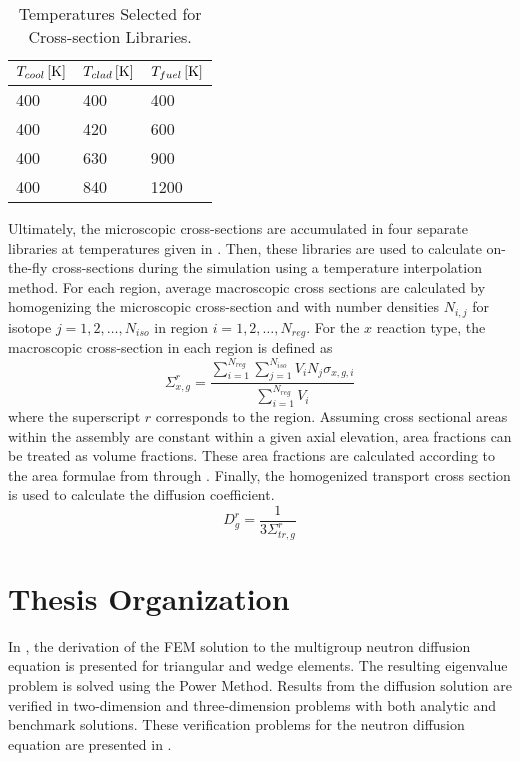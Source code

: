   \begin{table}
    \caption{Temperatures Selected for Cross-section Libraries.}
    \label{tab:xstemps}
    \begin{center}
      \begin{tabular}{lll}
        \toprule
        $T_{cool} \left[\text{{K}}\right]$ & $T_{clad} \left[\text{{K}}\right]$ & $T_{fuel} \left[\text{{K}}\right]$ \\
        \midrule
        400 & 400 & 400  \\
        400 & 420 & 600  \\
        400 & 630 & 900  \\
        400 & 840 & 1200 \\
        \bottomrule
      \end{tabular}
    \end{center}
  \end{table}

  Ultimately, the microscopic cross-sections are accumulated in four separate 
  libraries at temperatures given in . Then, these libraries 
  are used to calculate on-the-fly cross-sections during the simulation using a
  temperature interpolation method.
  For each region, average macroscopic cross
  sections are calculated by homogenizing the microscopic cross-section and with 
  number densities $N_{i,j}$ for isotope ${j=1,2,\ldots,N_{iso}}$ in region
  ${i=1,2,\ldots,N_{reg}}$.  For the $x$ reaction type, the 
  macroscopic cross-section in each region is defined as
  \begin{equation}
    \Sigma_{x,g}^r = \frac{\sum_{i=1}^{N_{reg}} \sum_{j=1}^{N_{iso}} V_i N_{j} 
      \sigma_{x,g,i}} {\sum_{i=1}^{N_{reg}}V_i}
  \end{equation}
  where the superscript $r$ corresponds to the region. Assuming cross sectional
  areas within the assembly are constant within a given axial elevation, area
  fractions can be treated as volume fractions. These area fractions are
  calculated according to the area formulae from  through
  . Finally, the homogenized transport cross section is used 
  to calculate the diffusion coefficient.
  \begin{equation}
    D_g^r = \frac{1}{3 \Sigma_{tr,g}^r}
  \end{equation}

\section{Thesis Organization}
  In , the derivation of the FEM solution to the
  multigroup neutron diffusion equation is
  presented for triangular and wedge elements. The resulting eigenvalue problem
  is solved using the Power Method. Results from the diffusion solution are
  verified in two-dimension and three-dimension problems with both analytic and
  benchmark solutions. These verification problems for the neutron diffusion
  equation are presented in .

